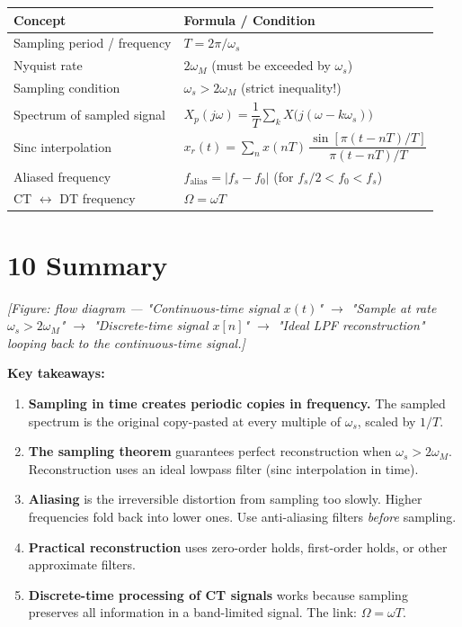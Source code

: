 \documentclass[11pt]{article}
\begin{document}
\begin{center}
\begin{tabular}{|l|l|}
\hline
\textbf{Concept} & \textbf{Formula / Condition} \\
\hline
Sampling period / frequency & $T = 2\pi/\omega_s$ \\
\hline
Nyquist rate & $2\omega_M$ (must be exceeded by $\omega_s$) \\
\hline
Sampling condition & $\omega_s > 2\omega_M$ (strict inequality!) \\
\hline
Spectrum of sampled signal & $X_p(j\omega) = \dfrac{1}{T}\sum_{k} X\!\big(j(\omega - k\omega_s)\big)$ \\
\hline
Sinc interpolation & $x_r(t) = \sum_{n} x(nT)\,\dfrac{\sin[\pi(t-nT)/T]}{\pi(t-nT)/T}$ \\
\hline
Aliased frequency & $f_\text{alias} = |f_s - f_0|$ (for $f_s/2 < f_0 < f_s$) \\
\hline
CT $\leftrightarrow$ DT frequency & $\Omega = \omega T$ \\
\hline
\end{tabular}
\end{center}

\section*{10 Summary}

\textit{[Figure: flow diagram — "Continuous-time signal $x(t)$" $\to$ "Sample at rate $\omega_s > 2\omega_M$" $\to$ "Discrete-time signal $x[n]$" $\to$ "Ideal LPF reconstruction" looping back to the continuous-time signal.]}

\textbf{Key takeaways:}

\begin{enumerate}
  \item \textbf{Sampling in time creates periodic copies in frequency.} The sampled spectrum is the original copy-pasted at every multiple of $\omega_s$, scaled by $1/T$.
  \item \textbf{The sampling theorem} guarantees perfect reconstruction when $\omega_s > 2\omega_M$. Reconstruction uses an ideal lowpass filter (sinc interpolation in time).
  \item \textbf{Aliasing} is the irreversible distortion from sampling too slowly. Higher frequencies fold back into lower ones. Use anti-aliasing filters \textit{before} sampling.
  \item \textbf{Practical reconstruction} uses zero-order holds, first-order holds, or other approximate filters.
  \item \textbf{Discrete-time processing of CT signals} works because sampling preserves all information in a band-limited signal. The link: $\Omega = \omega T$.
\end{enumerate}
\end{document}
